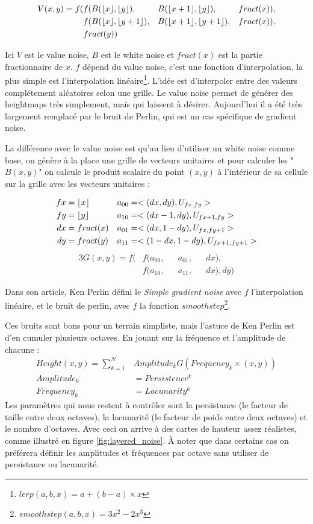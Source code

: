 \documentclass{EPUProjetDi}
\DeclarePairedDelimiter\floor{\lfloor}{\rfloor}%
\DeclarePairedDelimiter\fract{fract(}{)}
\begin{document}
\begin{alignat*}{3}
	V(x,y) =f( &f(B(\floor{x},\floor{y}), &&B(\floor{x+1},\floor{y}), &&\fract{x}),\\
			&f(B(\floor{x},\floor{y+1}), &&B(\floor{x+1},\floor{y+1}), &&\fract{x}),\\
			&\fract{y})
\end{alignat*}

Ici $V$ est le value noise, $B$ est le white noise et $fract(x)$ est la partie fractionnaire de $x$. $f$ dépend du value noise, c'est une fonction d'interpolation, la plus simple est l'interpolation linéaire\footnote{$lerp(a,b,x) = a+(b-a)\times x$}.
L'idée est d'interpoler entre des valeurs complétement aléatoires selon une grille. Le value noise permet de générer des heightmaps très simplement, mais qui laissent à désirer. Aujourd'hui il a été très largement remplacé par le bruit de Perlin, qui est un cas spécifique de gradient noise.

La différence avec le value noise est qu'au lieu d'utiliser un white noise comme base, on génère à la place une grille de vecteurs unitaires et pour calculer les "$B(x,y)$" on calcule le produit scalaire du point $(x,y)$ à l'intérieur de sa cellule sur la grille avec les vecteurs unitaires :

\begin{align*}
	fx&=\floor{x} & a_{00}&=<(dx,dy), U_{fx,fy}>\\
	fy&=\floor{y} & a_{10}&=<(dx-1,dy), U_{fx+1,fy}>\\
	dx&=\fract{x} & a_{01}&=<(dx,1-dy), U_{fx,fy+1}>\\
	dy&=\fract{y} & a_{11}&=<(1-dx,1-dy), U_{fx+1,fy+1}>
\end{align*}
\begin{alignat*}{3}
	G(x,y) =f( &f(a_{00}, &&a_{01}, &&dx),\\
			&f(a_{10}, &&a_{11}, &&dx), dy)
\end{alignat*}

Dans son article\cite{perlinnoise}, Ken Perlin défini le \textit{Simple gradient noise} avec $f$ l'interpolation linéaire, et le bruit de perlin, avec $f$ la fonction $smoothstep$\footnote{$smoothstep(a,b,x) = 3x^2-2x^3$}.

Ces bruits sont bons pour un terrain simpliste, mais l'astuce de Ken Perlin est d'en cumuler plusieurs octaves. En jouant sur la fréquence et l'amplitude de chacune :
\begin{align*}
	Height(x,y) = \sum_{k=1}^{N}&Amplitude_k G(Frequency_k\times(x,y))\\
	Amplitude_k &= Persistence^k\\ 
	Frequency_k &= Lacunarity^k
\end{align*}
Les paramètres qui nous restent à contrôler sont la persistance (le facteur de taille entre deux octaves), la lacunarité (le facteur de poids entre deux octaves) et le nombre d'octaves. Avec ceci on arrive à des cartes de hauteur assez réalistes, comme illustré en figure \ref{fig:layered_noise}. À noter que dans certains cas on préférera définir les amplitudes et fréquences par octave sans utiliser de persistance ou lacunarité.
\end{document}
